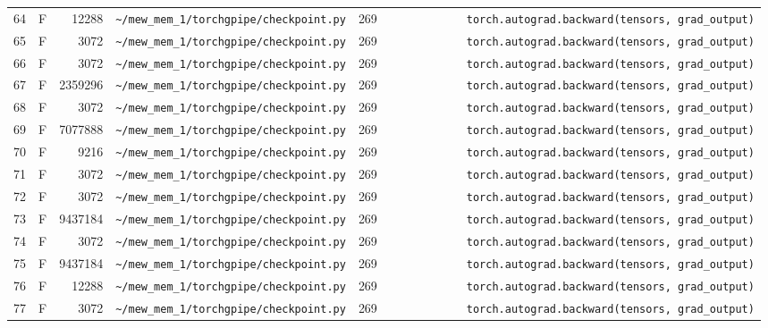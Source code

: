 \documentclass{article}
\begin{document}
\begin{longtable}{r l r p{6.5cm} r p{7.0cm}}
64 & F & 12288 & \lstinline|~/mew_mem_1/torchgpipe/checkpoint.py| & 269 & \lstinline|            torch.autograd.backward(tensors, grad_output)| \\
65 & F & 3072 & \lstinline|~/mew_mem_1/torchgpipe/checkpoint.py| & 269 & \lstinline|            torch.autograd.backward(tensors, grad_output)| \\
66 & F & 3072 & \lstinline|~/mew_mem_1/torchgpipe/checkpoint.py| & 269 & \lstinline|            torch.autograd.backward(tensors, grad_output)| \\
67 & F & 2359296 & \lstinline|~/mew_mem_1/torchgpipe/checkpoint.py| & 269 & \lstinline|            torch.autograd.backward(tensors, grad_output)| \\
68 & F & 3072 & \lstinline|~/mew_mem_1/torchgpipe/checkpoint.py| & 269 & \lstinline|            torch.autograd.backward(tensors, grad_output)| \\
69 & F & 7077888 & \lstinline|~/mew_mem_1/torchgpipe/checkpoint.py| & 269 & \lstinline|            torch.autograd.backward(tensors, grad_output)| \\
70 & F & 9216 & \lstinline|~/mew_mem_1/torchgpipe/checkpoint.py| & 269 & \lstinline|            torch.autograd.backward(tensors, grad_output)| \\
71 & F & 3072 & \lstinline|~/mew_mem_1/torchgpipe/checkpoint.py| & 269 & \lstinline|            torch.autograd.backward(tensors, grad_output)| \\
72 & F & 3072 & \lstinline|~/mew_mem_1/torchgpipe/checkpoint.py| & 269 & \lstinline|            torch.autograd.backward(tensors, grad_output)| \\
73 & F & 9437184 & \lstinline|~/mew_mem_1/torchgpipe/checkpoint.py| & 269 & \lstinline|            torch.autograd.backward(tensors, grad_output)| \\
74 & F & 3072 & \lstinline|~/mew_mem_1/torchgpipe/checkpoint.py| & 269 & \lstinline|            torch.autograd.backward(tensors, grad_output)| \\
75 & F & 9437184 & \lstinline|~/mew_mem_1/torchgpipe/checkpoint.py| & 269 & \lstinline|            torch.autograd.backward(tensors, grad_output)| \\
76 & F & 12288 & \lstinline|~/mew_mem_1/torchgpipe/checkpoint.py| & 269 & \lstinline|            torch.autograd.backward(tensors, grad_output)| \\
77 & F & 3072 & \lstinline|~/mew_mem_1/torchgpipe/checkpoint.py| & 269 & \lstinline|            torch.autograd.backward(tensors, grad_output)| \\

\end{longtable}
\end{document}

